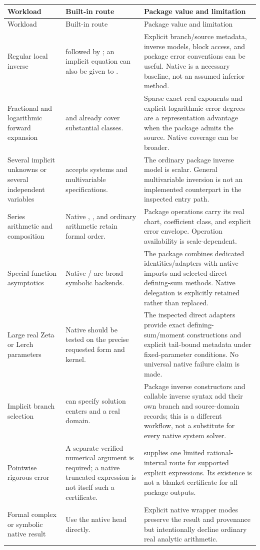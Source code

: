 \documentclass[11pt,letterpaper]{article}
\theoremstyle{definition}\newtheorem{definition}[proposition]{Definition}
\begin{document}
\begin{longtable}{@{}P{1.25in}P{2.15in}P{2.92in}@{}}
\toprule
Workload & Built-in route & Package value and limitation\\
\midrule
\endfirsthead
\toprule Workload & Built-in route & Package value and limitation\\\midrule
\endhead
Regular local inverse &  followed by ; an implicit equation can also be given to . & Explicit branch/source metadata, inverse models, block access, and package error conventions can be useful. Native is a necessary baseline, not an assumed inferior method.\\
Fractional and logarithmic forward expansion &  and  already cover substantial classes. & Sparse exact real exponents and explicit logarithmic error degrees are a representation advantage when the package admits the source. Native coverage can be broader.\\
Several implicit unknowns or several independent variables &  accepts systems and multivariable specifications. & The ordinary package inverse model is scalar. General multivariable inversion is not an implemented counterpart in the inspected entry path.\\
Series arithmetic and composition & Native , , and ordinary arithmetic retain formal order. & Package operations carry its real chart, coefficient class, and explicit error envelope. Operation availability is scale-dependent.\\
Special-function asymptotics & Native / are broad symbolic backends. & The package combines dedicated identities/adapters with native imports and selected direct defining-sum methods. Native delegation is explicitly retained rather than replaced.\\
Large real Zeta or Lerch parameters & Native should be tested on the precise requested form and kernel. & The inspected direct adapters provide exact defining-sum/moment constructions and explicit tail-bound metadata under fixed-parameter conditions. No universal native failure claim is made.\\
Implicit branch selection &  can specify solution centers and a real domain. & Package inverse constructors and callable inverse syntax add their own branch and source-domain records; this is a different workflow, not a substitute for every native system solver.\\
Pointwise rigorous error & A separate verified numerical argument is required; a native truncated expression is not itself such a certificate. &  supplies one limited rational-interval route for supported explicit expressions. Its existence is not a blanket certificate for all package outputs.\\
Formal complex or symbolic native result & Use the native head directly. & Explicit native wrapper modes preserve the result and provenance but intentionally decline ordinary real analytic arithmetic.\\
\bottomrule
\end{longtable}
\end{document}
